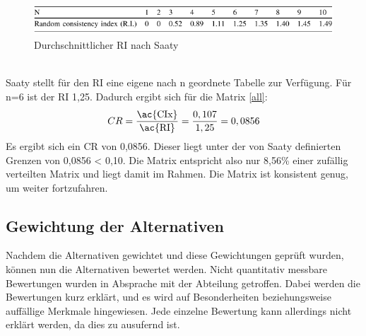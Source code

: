 \begin{figure}[h!]
	\centering
	\includegraphics[scale = 0.9]{img/RI.png}
	\caption{Durchschnittlicher RI nach Saaty}
	\label{img:ri2}
\end{figure}\\
Saaty stellt für den \ac{RI} eine eigene nach n geordnete Tabelle zur Verfügung. Für n=6 ist der \ac{RI} 1,25. Dadurch ergibt sich für die Matrix \ref{all}: 
\[CR=\frac{\mbox{\ac{CIx}}}{\mbox{\ac{RI}}}=\frac{0,107}{1,25}=0,0856\]
Es ergibt sich ein \ac{CR} von 0,0856. Dieser liegt unter der von Saaty definierten Grenzen von 0,0856 < 0,10. Die Matrix entspricht also nur 8,56\% einer zufällig verteilten Matrix und liegt damit im Rahmen. Die Matrix ist konsistent genug, um weiter fortzufahren.
\subsection{Gewichtung der Alternativen}
Nachdem die Alternativen gewichtet und diese Gewichtungen geprüft wurden, können nun die Alternativen bewertet werden. Nicht quantitativ messbare Bewertungen wurden in Absprache mit der Abteilung getroffen. Dabei werden die Bewertungen kurz erklärt, und es wird auf Besonderheiten beziehungsweise auffällige Merkmale hingewiesen. Jede einzelne Bewertung kann allerdings nicht erklärt werden, da dies zu ausufernd ist.
